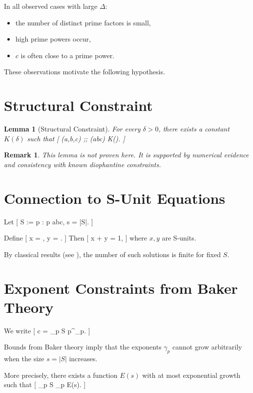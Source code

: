 \documentclass[11pt]{article}
\newtheorem{lemma}{Lemma}
\newtheorem{remark}{Remark}
\begin{document}
	In all observed cases with large $\Delta$:
	
	\begin{itemize}
		\item the number of distinct prime factors is small,
		\item high prime powers occur,
		\item $c$ is often close to a prime power.
	\end{itemize}
	
	These observations motivate the following hypothesis.
	
	\section{Structural Constraint}
	
	\begin{lemma}[Structural Constraint]
		For every $\delta>0$, there exists a constant $K(\delta)$ such that
		[
		\Delta(a,b,c) \ge \delta ;\Rightarrow; \omega(abc) \le K(\delta).
		]
	\end{lemma}
	
	\begin{remark}
		This lemma is not proven here. It is supported by numerical evidence
		and consistency with known diophantine constraints.
	\end{remark}
	
	\section{Connection to S-Unit Equations}
	
	Let
	[
	S := {p : p \mid abc}, \quad s = |S|.
	]
	
	Define
	[
	x = , \quad y = .
	]
	Then
	[
	x + y = 1,
	]
	where $x,y$ are S-units.
	
	By classical results (see \cite{EvertseGyory}),
	the number of such solutions is finite for fixed $S$.
	
	\section{Exponent Constraints from Baker Theory}
	
	We write
	[
	c = \prod_{p \in S} p^{\gamma_p}.
	]
	
	Bounds from Baker theory imply that the exponents $\gamma_p$ cannot grow
	arbitrarily when the size $s = |S|$ increases.
	
	More precisely, there exists a function $E(s)$ with at most exponential growth
	such that
	[
	\max_{p \in S} \gamma_p \le E(s).
	]
	
\end{document}
